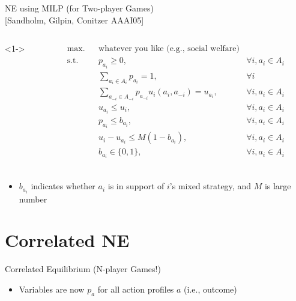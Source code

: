 \documentclass[11pt,aspectratio=169,handout]{beamer}
\begin{document}
  \begin{frame}{NE using MILP (for Two-player Games) \\{\small [Sandholm, Gilpin, Conitzer AAAI05]
}}
   \begin{columns}<1->
    \begin{column}{0.7\textwidth}
    {\small
     $$
      \begin{aligned}
       & \text{max.}
       & & \text{whatever you like (e.g., social welfare)} & \\
       & \text{s.t.} & & p_{a_i} \ge 0, & \forall i, a_i \in A_i \\
       & & &\sum_{a_i \in A_i} p_{a_i} = 1, & \forall i \\
       & & & \sum_{a_{-i} \in A_{-i}}p_{a_{-i}}u_i(a_i,a_{-i}) = u_{a_i}, & \forall i, a_i \in A_i \\
       & & & u_{a_i} \le u_{i}, & \forall i, a_i \in A_i \\
       & & & p_{a_i} \le b_{a_i}, & \forall i, a_i \in A_i \\
       & & & u_i - u_{a_i} \le M (1 - b_{a_i}), & \forall i, a_i \in A_i \\
       & & & b_{a_i} \in \{0,1\}, & \forall i, a_i \in A_i \\
      \end{aligned}
     $$
    }
    \end{column}
   \end{columns}
   \vspace{0.5cm}
   \begin{itemize}
    \item<2-> $b_{a_i}$ indicates whether $a_i$ is in support of $i$'s mixed strategy, and $M$ is large number
   \end{itemize}
  \end{frame}

 \section{Correlated NE}
  \begin{frame}{Correlated Equilibrium (N-player Games!)}
   \begin{itemize}
    \item<1-> Variables are now $p_a$ for all action profiles $a$ (i.e., outcome)
   \end{itemize}
  \end{frame}
  
\end{document}
